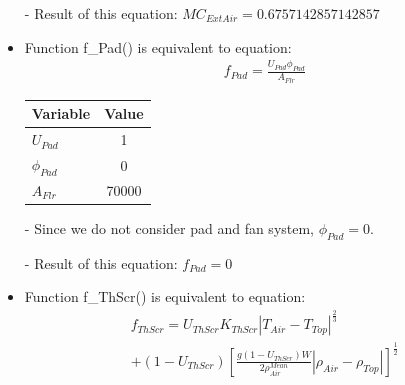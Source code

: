 \documentclass[a4paper]{article}
\numberwithin{equation}{section}
\begin{document}
\begin{itemize}
  \item[-] Result of this equation: \(MC_{ExtAir} = 0.6757142857142857\)

  \item Function f\_Pad() is equivalent to equation:\label{fPad}
        \begin{align*}
          f_{Pad} = \frac{U_{Pad} \phi_{Pad}}{A_{Flr}}
        \end{align*}

        \begin{table}[H]
          \centering
          \begin{tabular}{@{}lS@{}}
            \toprule
            \textbf{Variable} & \textbf{Value} \\
            \midrule
            \(U_{Pad}\)       & 1              \\
            \(\phi_{Pad}\)    & 0              \\
            \(A_{Flr}\)       & 70000          \\
            \bottomrule
          \end{tabular}
        \end{table}
  \item[-] Since we do not consider pad and  fan system, \(\phi_{Pad} = 0\).
  \item[-] Result of this equation: \(f_{Pad} = 0\)

  \item Function f\_ThScr() is equivalent to equation:\label{fThScr}
        \begin{multline*}
          f_{ThScr} = U_{ThScr} K_{ThScr} |T_{Air} - T_{Top}|^{\frac{2}{3}} \\
          + (1 - U_{ThScr}) {\left[\frac{g(1 - U_{ThScr})W}{2\rho^{Mean}_{Air}} |\rho_{Air} - \rho_{Top}|\right]}^{\frac{1}{2}}
        \end{multline*}


\end{itemize}
\end{document}
